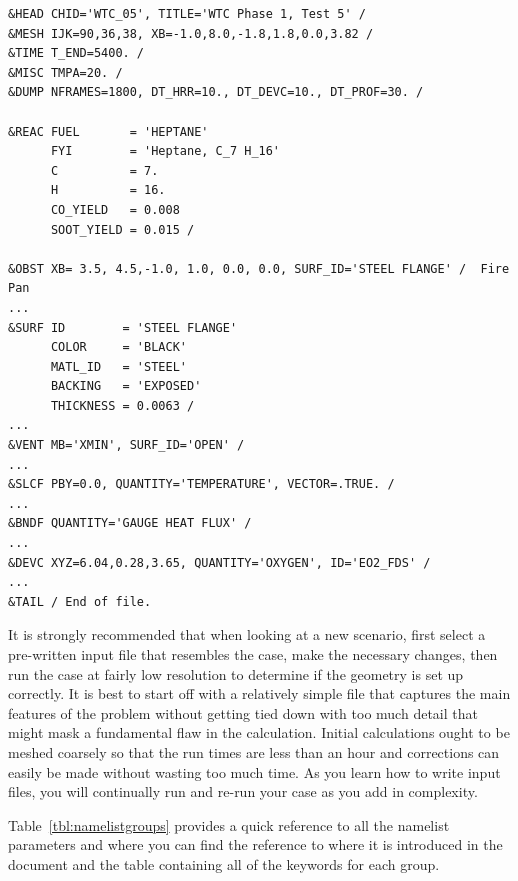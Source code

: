 \documentclass[11pt]{book}
\begin{document}
\footnotesize
\begin{verbatim}
&HEAD CHID='WTC_05', TITLE='WTC Phase 1, Test 5' /
&MESH IJK=90,36,38, XB=-1.0,8.0,-1.8,1.8,0.0,3.82 /
&TIME T_END=5400. /
&MISC TMPA=20. /
&DUMP NFRAMES=1800, DT_HRR=10., DT_DEVC=10., DT_PROF=30. /

&REAC FUEL       = 'HEPTANE'
      FYI        = 'Heptane, C_7 H_16'
      C          = 7.
      H          = 16.
      CO_YIELD   = 0.008
      SOOT_YIELD = 0.015 /

&OBST XB= 3.5, 4.5,-1.0, 1.0, 0.0, 0.0, SURF_ID='STEEL FLANGE' /  Fire Pan
...
&SURF ID        = 'STEEL FLANGE'
      COLOR     = 'BLACK'
      MATL_ID   = 'STEEL'
      BACKING   = 'EXPOSED'
      THICKNESS = 0.0063 /
...
&VENT MB='XMIN', SURF_ID='OPEN' /
...
&SLCF PBY=0.0, QUANTITY='TEMPERATURE', VECTOR=.TRUE. /
...
&BNDF QUANTITY='GAUGE HEAT FLUX' /
...
&DEVC XYZ=6.04,0.28,3.65, QUANTITY='OXYGEN', ID='EO2_FDS' /
...
&TAIL / End of file.
\end{verbatim}
\normalsize

\noindent
It is strongly recommended that when looking at a new scenario,
first select a pre-written input file that resembles the case,
make the necessary changes, then run the case at fairly low
resolution to determine if the geometry is set up correctly.
It is best to start off with a relatively simple file that captures the main
features of the problem without getting tied down with too much detail that
might mask a fundamental flaw in the calculation. Initial calculations ought
to be meshed coarsely so that the run times are less than an hour and
corrections can easily be made without wasting too much time.
As you learn how to write input files, you will continually
run and re-run your case as you add in complexity.

Table~\ref{tbl:namelistgroups} provides a quick reference to all the namelist parameters and
where you can find the reference to where it is introduced in the document and the
table containing all of the keywords for each group.
\end{document}
